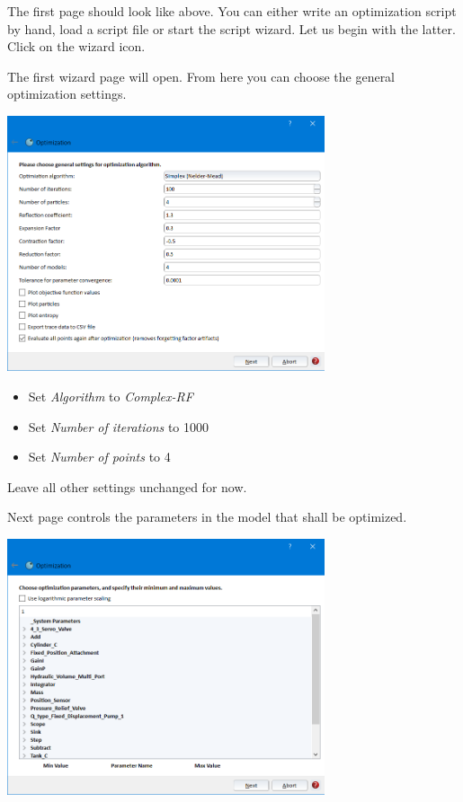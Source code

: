 \documentclass[a4paper,pdftex]{article}
\begin{document}
\begin{tutenumerate}
The first page should look like above. You can either write an optimization script by hand, load a script file or start the script wizard. 
Let us begin with the latter.
Click on the wizard icon.


%
The first wizard page will open. From here you can choose the general optimization settings.
%
\begin{center}
\includegraphics[width=0.7\textwidth]{gfx/optimization/screenshot-opt1.png}
\end{center}
%
\begin{itemize}
\item Set \textit{Algorithm} to \textit{Complex-RF}
\item Set \textit{Number of iterations} to 1000
\item Set \textit{Number of points} to 4
\end{itemize}
Leave all other settings unchanged for now.

\pagebreak
{} 
Next page controls the parameters in the model that shall be optimized. 

\begin{center}
\includegraphics[width=0.7\textwidth]{gfx/optimization/screenshot-opt2.png}
\end{center}


\end{tutenumerate}
\end{document}
